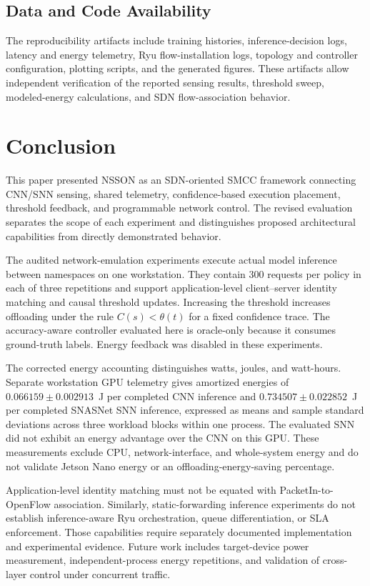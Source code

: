 \documentclass[journal]{IEEEtran}
\begin{document}
\subsection*{Data and Code Availability}
The reproducibility artifacts include training histories, inference-decision logs, latency and energy telemetry, Ryu flow-installation logs, topology and controller configuration, plotting scripts, and the generated figures. These artifacts allow independent verification of the reported sensing results, threshold sweep, modeled-energy calculations, and SDN flow-association behavior.

\section{Conclusion}
\label{sec:conclusion}

This paper presented NSSON as an SDN-oriented SMCC framework
connecting CNN/SNN sensing, shared telemetry, confidence-based
execution placement, threshold feedback, and programmable
network control. The revised evaluation separates the scope of
each experiment and distinguishes proposed architectural
capabilities from directly demonstrated behavior.

The audited network-emulation experiments execute actual model
inference between namespaces on one workstation. They contain
300 requests per policy in each of three repetitions and support
application-level client--server identity matching and causal
threshold updates. Increasing the threshold increases offloading
under the rule $C(s)<\theta(t)$ for a fixed confidence trace.
The accuracy-aware controller evaluated here is oracle-only
because it consumes ground-truth labels. Energy feedback was
disabled in these experiments.

The corrected energy accounting distinguishes watts, joules,
and watt-hours. Separate workstation GPU telemetry gives
amortized energies of $0.066159 \pm 0.002913$~J per completed
CNN inference and $0.734507 \pm 0.022852$~J per completed
SNASNet SNN inference, expressed as means and sample standard
deviations across three workload blocks within one process.
The evaluated SNN did not exhibit an energy advantage over the
CNN on this GPU. These measurements exclude CPU, network-interface,
and whole-system energy and do not validate Jetson Nano energy
or an offloading-energy-saving percentage.

Application-level identity matching must not be equated with
PacketIn-to-OpenFlow association. Similarly, static-forwarding
inference experiments do not establish inference-aware Ryu
orchestration, queue differentiation, or SLA enforcement.
Those capabilities require separately documented implementation
and experimental evidence. Future work includes target-device
power measurement, independent-process energy repetitions,
and validation of cross-layer control under concurrent traffic.



\end{document}

